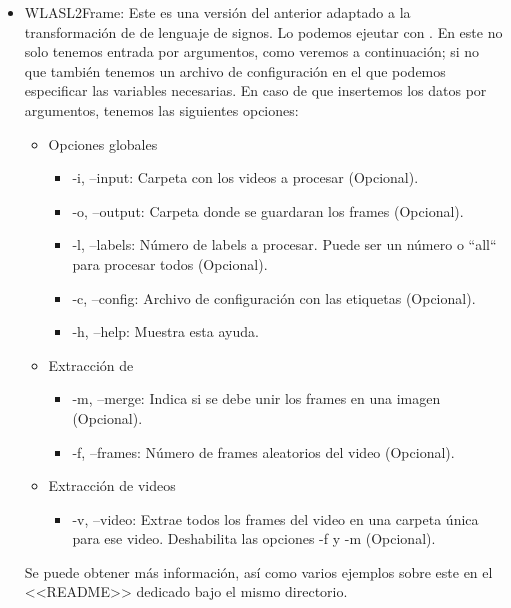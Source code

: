 \begin{itemize}
  \item WLASL2Frame: Este  es una versión del anterior adaptado a la transformación de  de lenguaje de signos. Lo podemos ejeutar con . En este  no solo tenemos entrada por argumentos, como veremos a continuación; si no que también tenemos un archivo de configuración  en el que podemos especificar las variables necesarias. En caso de que insertemos los datos por argumentos, tenemos las siguientes opciones:
        \begin{itemize}
          \item Opciones globales
                \begin{itemize}
                  \item -i, --input: Carpeta con los videos a procesar (Opcional).
                  \item -o, --output: Carpeta donde se guardaran los frames (Opcional).
                  \item -l, --labels: Número de labels a procesar. Puede ser un número o ``all`` para procesar todos (Opcional).
                  \item -c, --config: Archivo de configuración con las etiquetas (Opcional).
                  \item -h, --help: Muestra esta ayuda.
                \end{itemize}

          \item Extracción de 
                \begin{itemize}
                  \item -m, --merge: Indica si se debe unir los frames en una imagen (Opcional).
                  \item -f, --frames: Número de frames aleatorios del video (Opcional).
                \end{itemize}

          \item Extracción de videos
                \begin{itemize}
                  \item -v, --video: Extrae todos los frames del video en una carpeta única para ese video. Deshabilita las opciones -f y -m (Opcional).
                \end{itemize}
        \end{itemize}

        Se puede obtener más información, así como varios ejemplos sobre este  en el <<README>> dedicado bajo el mismo directorio.

\end{itemize}

